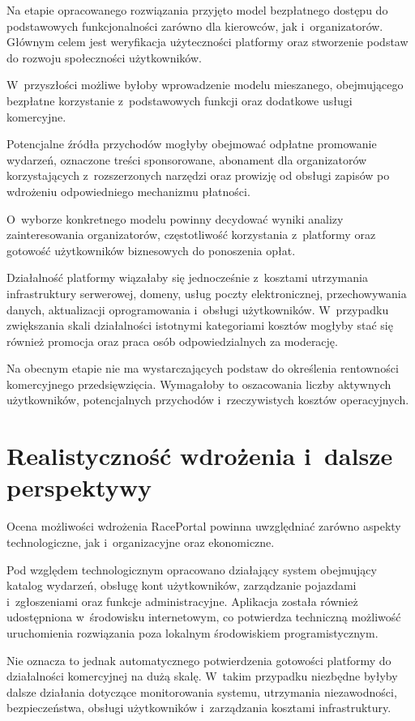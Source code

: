 \documentclass{sprz}
\begin{document}
Na etapie opracowanego rozwiązania przyjęto model bezpłatnego dostępu do podstawowych funkcjonalności zarówno dla kierowców, jak i~organizatorów. Głównym celem jest weryfikacja użyteczności platformy oraz stworzenie podstaw do rozwoju społeczności użytkowników.

W~przyszłości możliwe byłoby wprowadzenie modelu mieszanego, obejmującego bezpłatne korzystanie z~podstawowych funkcji oraz dodatkowe usługi komercyjne.

Potencjalne źródła przychodów mogłyby obejmować odpłatne promowanie wydarzeń, oznaczone treści sponsorowane, abonament dla organizatorów korzystających z~rozszerzonych narzędzi oraz prowizję od obsługi zapisów po wdrożeniu odpowiedniego mechanizmu płatności.

O~wyborze konkretnego modelu powinny decydować wyniki analizy zainteresowania organizatorów, częstotliwość korzystania z~platformy oraz gotowość użytkowników biznesowych do ponoszenia opłat.

Działalność platformy wiązałaby się jednocześnie z~kosztami utrzymania infrastruktury serwerowej, domeny, usług poczty elektronicznej, przechowywania danych, aktualizacji oprogramowania i~obsługi użytkowników. W~przypadku zwiększania skali działalności istotnymi kategoriami kosztów mogłyby stać się również promocja oraz praca osób odpowiedzialnych za moderację.

Na obecnym etapie nie ma wystarczających podstaw do określenia rentowności komercyjnego przedsięwzięcia. Wymagałoby to oszacowania liczby aktywnych użytkowników, potencjalnych przychodów i~rzeczywistych kosztów operacyjnych.

\section{Realistyczność wdrożenia i~dalsze perspektywy}
Ocena możliwości wdrożenia RacePortal powinna uwzględniać zarówno aspekty technologiczne, jak i~organizacyjne oraz ekonomiczne.

Pod względem technologicznym opracowano działający system obejmujący katalog wydarzeń, obsługę kont użytkowników, zarządzanie pojazdami i~zgłoszeniami oraz funkcje administracyjne. Aplikacja została również udostępniona w~środowisku internetowym, co potwierdza techniczną możliwość uruchomienia rozwiązania poza lokalnym środowiskiem programistycznym.

Nie oznacza to jednak automatycznego potwierdzenia gotowości platformy do działalności komercyjnej na dużą skalę. W~takim przypadku niezbędne byłyby dalsze działania dotyczące monitorowania systemu, utrzymania niezawodności, bezpieczeństwa, obsługi użytkowników i~zarządzania kosztami infrastruktury.
\end{document}
